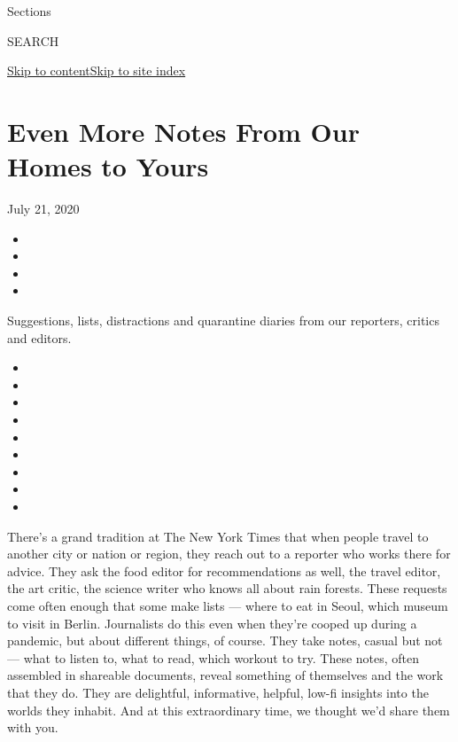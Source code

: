 Sections

SEARCH

\protect\hyperlink{site-content}{Skip to
content}\protect\hyperlink{site-index}{Skip to site index}

\hypertarget{even-more-notes-from-our-homes-to-yours}{%
\section{Even More Notes From Our Homes to
Yours}\label{even-more-notes-from-our-homes-to-yours}}

July 21, 2020

\begin{itemize}
\item
\item
\item
\item
\end{itemize}

Suggestions, lists, distractions and quarantine diaries from our
reporters, critics and editors.

\begin{itemize}
\item
\item
\item
\item
\item
\item
\item
\item
\item
\end{itemize}

There's a grand tradition at The New York Times that when people travel
to another city or nation or region, they reach out to a reporter who
works there for advice. They ask the food editor for recommendations as
well, the travel editor, the art critic, the science writer who knows
all about rain forests. These requests come often enough that some make
lists --- where to eat in Seoul, which museum to visit in Berlin.
Journalists do this even when they're cooped up during a pandemic, but
about different things, of course. They take notes, casual but not ---
what to listen to, what to read, which workout to try. These notes,
often assembled in shareable documents, reveal something of themselves
and the work that they do. They are delightful, informative, helpful,
low-fi insights into the worlds they inhabit. And at this extraordinary
time, we thought we'd share them with you.

